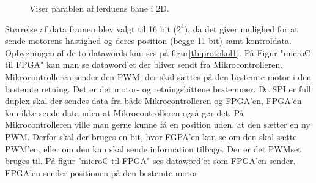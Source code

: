 \begin{figure}[h!]
\centering
{}
\qquad
{}
\caption[Lerduens parabel i 2D]{Viser parablen af lerduens bane i 2D.}
\end{figure}


Størrelse af data framen blev valgt til 16 bit ($2^4$), da det giver mulighed for at sende motorens hastighed og deres position (begge 11 bit) samt kontroldata. Opbygningen af de to datawords kan ses på figur\ref{tb:protokol1}.
På Figur "microC til FPGA" kan man se dataword'et der bliver sendt fra Mikrocontrolleren. Mikrocontrolleren sender den  PWM, der skal sættes på den bestemte motor i den bestemte retning. Det er det motor- og retningsbittene bestemmer.
Da SPI er full duplex skal der sendes data fra både Mikrocontrolleren og FPGA’en, FPGA’en kan ikke sende data uden at Mikrocontrolleren også gør det. På Mikrocontrolleren ville man gerne kunne få en position uden, at den sætter en ny PWM. Derfor skal der bruges en bit, hvor FGPA’en kan se om den skal sætte PWM’en, eller om den kun skal sende information tilbage. Der er det PWMset bruges til.
På figur "microC til FPGA" ses dataword'et som FPGA'en sender. FPGA'en sender positionen på den bestemte motor.


